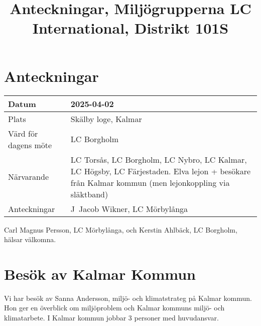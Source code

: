 \documentclass[12pt,a4paper]{article}
\title{Anteckningar, Miljögrupperna LC International, Distrikt 101S}
\begin{document}
\maketitle

\section{Anteckningar}

\begin{table}[h]
  \center
  \begin{tabular}{p{4cm}|p{11cm}}
    Datum & 2025-04-02 \\ \hline
    Plats & Skälby loge, Kalmar \\ \hline
    Värd för dagens möte &  LC Borgholm \\ \hline
    Närvarande  &  LC Torsås, LC Borgholm, LC Nybro, LC Kalmar, LC Högsby, LC Färjestaden. \newline
    Elva lejon + besökare från Kalmar kommun (men lejonkoppling via släktband) \\ \hline
    Anteckningar & J~Jacob Wikner, LC Mörbylånga 
   \end{tabular}
\end{table}
  

Carl Magnus Persson, LC Mörbylånga, och Kerstin Ahlbäck, LC Borgholm, hälsar välkomna.


\section{Besök av Kalmar Kommun}

Vi har besök av Sanna Andersson, miljö- och klimatstrateg på Kalmar kommun.
Hon ger en överblick om miljöproblem och Kalmar kommuns miljö- och klimatarbete.
I Kalmar kommun jobbar 3 personer med huvudansvar.
\end{document}
